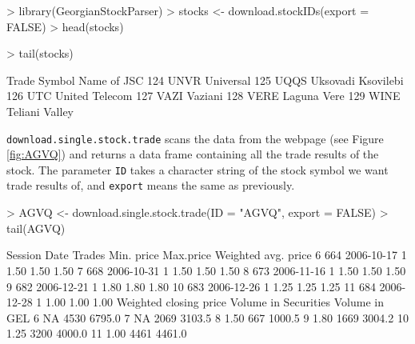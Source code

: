 \documentclass[a4paper]{article}
\begin{document}
\begin{Schunk}
\begin{Sinput}
> library(GeorgianStockParser)
> stocks <- download.stockIDs(export = FALSE)
> head(stocks)
\end{Sinput}
\begin{Sinput}
> tail(stocks)
\end{Sinput}
\begin{Soutput}
    Trade Symbol        Name of JSC
124         UNVR          Universal
125         UQQS Uksovadi Ksovilebi
126          UTC     United Telecom
127         VAZI            Vaziani
128         VERE        Laguna Vere
129         WINE     Teliani Valley
\end{Soutput}
\end{Schunk}

\texttt{download.single.stock.trade} scans the data from the webpage (see Figure \ref{fig:AGVQ}) and returns a data frame containing all the trade results of the stock. The parameter \texttt{ID} takes a character string of the stock symbol we want trade results of, and \texttt{export} means the same as previously.

\begin{Schunk}
\begin{Sinput}
> AGVQ <- download.single.stock.trade(ID = "AGVQ", export = FALSE)
> tail(AGVQ)
\end{Sinput}
\begin{Soutput}
   Session       Date Trades Min. price Max.price Weighted avg. price
6      664 2006-10-17      1       1.50      1.50                1.50
7      668 2006-10-31      1       1.50      1.50                1.50
8      673 2006-11-16      1       1.50      1.50                1.50
9      682 2006-12-21      1       1.80      1.80                1.80
10     683 2006-12-26      1       1.25      1.25                1.25
11     684 2006-12-28      1       1.00      1.00                1.00
   Weighted closing price Volume in Securities Volume in GEL
6                      NA                 4530        6795.0
7                      NA                 2069        3103.5
8                    1.50                  667        1000.5
9                    1.80                 1669        3004.2
10                   1.25                 3200        4000.0
11                   1.00                 4461        4461.0
\end{Soutput}
\end{Schunk}
\end{document}
